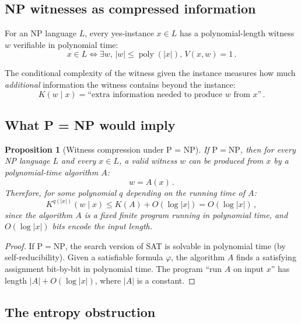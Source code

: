 \documentclass[aps,prd,twocolumn,superscriptaddress,nofootinbib]{revtex4-2}
\newtheorem{proposition}[theorem]{Proposition}
\theoremstyle{definition}
\theoremstyle{remark}
\DeclareMathOperator{\poly}{poly}
\newcommand{\NP}{\mathrm{NP}}
\newcommand{\PP}{\mathrm{P}}
\begin{document}
\subsection{NP witnesses as compressed information}

For an NP language $L$, every yes-instance $x \in L$ has a polynomial-length witness $w$ verifiable in polynomial time:
\begin{equation}
x \in L \iff \exists w,\, |w| \leq \poly(|x|),\, V(x, w) = 1\,.
\end{equation}

The conditional complexity of the witness given the instance measures how much \textit{additional} information the witness contains beyond the instance:
\begin{equation}
K(w \mid x) = \text{``extra information needed to produce } w \text{ from } x\text{''}\,.
\end{equation}

\subsection{What P = NP would imply}

\begin{proposition}[Witness compression under P = NP]
\label{prop:compression}
If $\PP = \NP$, then for every NP language $L$ and every $x \in L$, a valid witness $w$ can be produced from $x$ by a polynomial-time algorithm $A$:
\begin{equation}
w = A(x)\,.
\end{equation}
Therefore, for some polynomial $q$ depending on the running time of $A$:
\begin{equation}
K^{q(|x|)}(w \mid x) \leq K(A) + O(\log|x|) = O(\log|x|)\,,
\label{eq:compression}
\end{equation}
since the algorithm $A$ is a fixed finite program running in polynomial time, and $O(\log|x|)$ bits encode the input length.
\end{proposition}

\begin{proof}
If $\PP = \NP$, the search version of SAT is solvable in polynomial time (by self-reducibility). Given a satisfiable formula $\varphi$, the algorithm $A$ finds a satisfying assignment bit-by-bit in polynomial time. The program ``run $A$ on input $x$'' has length $|A| + O(\log|x|)$, where $|A|$ is a constant.
\end{proof}

\subsection{The entropy obstruction}
\end{document}
